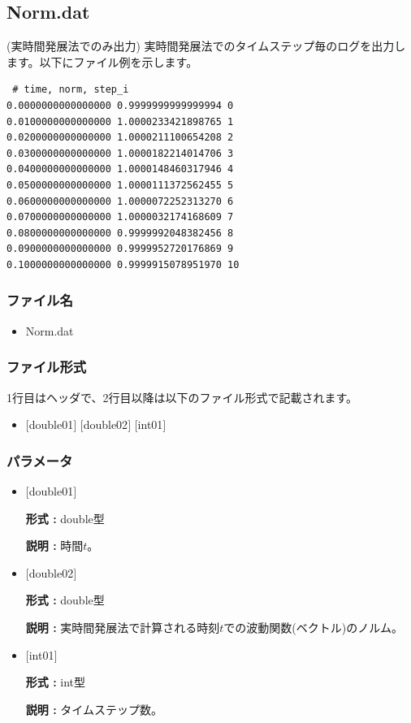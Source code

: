 \newpage
\subsection{{Norm.dat}}
\label{Subsec:normTE}
(実時間発展法でのみ出力) 実時間発展法でのタイムステップ毎のログを出力します。以下にファイル例を示します。\\

\begin{minipage}{15cm}
\begin{screen}
\begin{verbatim}
 # time, norm, step_i
0.0000000000000000 0.9999999999999994 0
0.0100000000000000 1.0000233421898765 1
0.0200000000000000 1.0000211100654208 2
0.0300000000000000 1.0000182214014706 3
0.0400000000000000 1.0000148460317946 4
0.0500000000000000 1.0000111372562455 5
0.0600000000000000 1.0000072252313270 6
0.0700000000000000 1.0000032174168609 7
0.0800000000000000 0.9999992048382456 8
0.0900000000000000 0.9999952720176869 9
0.1000000000000000 0.9999915078951970 10
\end{verbatim}
\end{screen}
\end{minipage}

\subsubsection{ファイル名}
\begin{itemize}
   \item Norm.dat
  \end{itemize}

\subsubsection{ファイル形式}
1行目はヘッダで、2行目以降は以下のファイル形式で記載されます。
 \begin{itemize}
   \item $[$double01$]$ $[$double02$]$ $[$int01$]$
  \end{itemize}
\subsubsection{パラメータ}
 \begin{itemize}

  \item  $[$double01$]$
  
 {\bf 形式 :} double型

{\bf 説明 :} 時間$t$。
 
  \item $[$double02$]$

 {\bf 形式 :} double型 

{\bf 説明 :}  実時間発展法で計算される時刻$t$での波動関数(ベクトル)のノルム。

  \item $[$int01$]$

 {\bf 形式 :} int型 

{\bf 説明 :} タイムステップ数。

 \end{itemize}


